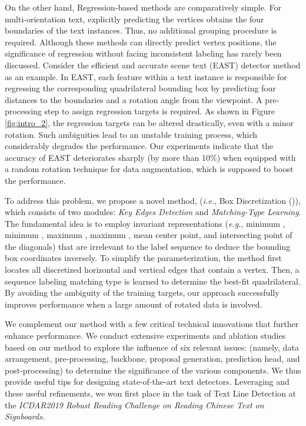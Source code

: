 On the other hand, Regression-based methods \cite{zhu2018sliding,liu2017deep,xue2019msr,liao2018rotation,ma2018arbitrary,liao2018textboxes++,he2018end,zhou2017east,he2017deep} are comparatively simple.
For multi-orientation text, explicitly predicting the vertices obtains the four boundaries of the text instances. Thus, no additional grouping procedure is required. Although these methods can directly predict vertex positions, the significance of regression without facing inconsistent labeling has rarely been discussed. Consider the efficient and accurate scene text (EAST) detector \cite{zhou2017east} method as an example. In EAST, each feature within a text instance is responsible for regressing the corresponding quadrilateral bounding box by predicting four distances to the boundaries and a rotation angle from the viewpoint.
A pre-processing step to assign regression targets is required. As shown in Figure \ref{fig:intro_2}, the regression targets can be altered drastically, even with a minor rotation. Such ambiguities lead to an unstable training process, which considerably degrades the performance. Our experiments indicate that the accuracy of EAST \cite{zhou2017east} 
deteriorates 
sharply (by more than 10\%) when equipped with a random rotation technique for data augmentation, which is supposed to boost the performance.



To address this problem, we propose a novel method, (\textit{i.e.}, \Orderless Box Discretization (\Ours)), which consists of two modules: \textit{Key Edges Detection} and \textit{Matching-Type Learning}. The fundamental idea is to employ invariant representations (\textit{e.g.}, minimum , minimum , maximum , maximum , mean center point, and intersecting point of the diagonals) that are irrelevant to the label sequence to deduce the bounding box coordinates inversely. To simplify the parameterization, the \Ours method first locates all discretized horizontal and vertical edges that contain a vertex. Then, a sequence labeling matching type is learned to determine the best-fit quadrilateral. By avoiding the ambiguity of the training targets, our approach successfully improves performance when a large amount of rotated data is involved. 


We complement our method with a few critical technical innovations that further enhance performance. We conduct extensive experiments and ablation studies based on our method to explore the influence of six relevant issues: 
(namely, data arrangement, pre-processing, backbone, proposal generation, prediction head, and post-processing) to determine the significance of the various components. 
We
thus 
provide useful tips for designing state-of-the-art text detectors. Leveraging \Ours and these useful refinements, we won first place in the task of Text Line Detection at the \textit{ICDAR2019 Robust Reading Challenge on Reading Chinese Text on Signboards}.


